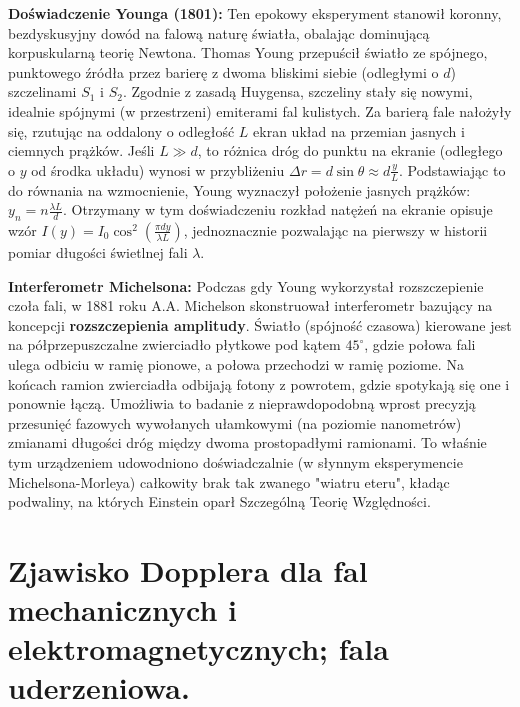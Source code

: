 \documentclass[11pt, a4paper]{article}
\begin{document}
\textbf{Doświadczenie Younga (1801):}
Ten epokowy eksperyment stanowił koronny, bezdyskusyjny dowód na falową naturę światła, obalając dominującą korpuskularną teorię Newtona. Thomas Young przepuścił światło ze spójnego, punktowego źródła przez barierę z dwoma bliskimi siebie (odległymi o $d$) szczelinami $S_1$ i $S_2$. Zgodnie z zasadą Huygensa, szczeliny stały się nowymi, idealnie spójnymi (w przestrzeni) emiterami fal kulistych. Za barierą fale nałożyły się, rzutując na oddalony o odległość $L$ ekran układ na przemian jasnych i ciemnych prążków. 
Jeśli $L \gg d$, to różnica dróg do punktu na ekranie (odległego o $y$ od środka układu) wynosi w przybliżeniu $\Delta r = d \sin\theta \approx d \frac{y}{L}$. Podstawiając to do równania na wzmocnienie, Young wyznaczył położenie jasnych prążków: $y_n = n \frac{\lambda L}{d}$. Otrzymany w tym doświadczeniu rozkład natężeń na ekranie opisuje wzór $I(y) = I_0 \cos^2\left(\frac{\pi d y}{\lambda L}\right)$, jednoznacznie pozwalając na pierwszy w historii pomiar długości świetlnej fali $\lambda$.

\textbf{Interferometr Michelsona:}
Podczas gdy Young wykorzystał rozszczepienie czoła fali, w 1881 roku A.A. Michelson skonstruował interferometr bazujący na koncepcji \textbf{rozszczepienia amplitudy}. Światło (spójność czasowa) kierowane jest na półprzepuszczalne zwierciadło płytkowe pod kątem $45^\circ$, gdzie połowa fali ulega odbiciu w ramię pionowe, a połowa przechodzi w ramię poziome. Na końcach ramion zwierciadła odbijają fotony z powrotem, gdzie spotykają się one i ponownie łączą. Umożliwia to badanie z nieprawdopodobną wprost precyzją przesunięć fazowych wywołanych ułamkowymi (na poziomie nanometrów) zmianami długości dróg między dwoma prostopadłymi ramionami. To właśnie tym urządzeniem udowodniono doświadczalnie (w słynnym eksperymencie Michelsona-Morleya) całkowity brak tak zwanego "wiatru eteru", kładąc podwaliny, na których Einstein oparł Szczególną Teorię Względności.

\section{Zjawisko Dopplera dla fal mechanicznych i elektromagnetycznych; fala uderzeniowa.}
\end{document}
